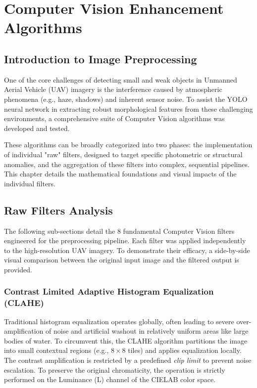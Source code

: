 
\chapter{Computer Vision Enhancement Algorithms}
\label{ch:filters}

\section{Introduction to Image Preprocessing}
One of the core challenges of detecting small and weak objects in Unmanned Aerial Vehicle (UAV) imagery is the interference caused by atmospheric phenomena (e.g., haze, shadows) and inherent sensor noise. To assist the YOLO neural network in extracting robust morphological features from these challenging environments, a comprehensive suite of Computer Vision algorithms was developed and tested.

These algorithms can be broadly categorized into two phases: the implementation of individual "raw" filters, designed to target specific photometric or structural anomalies, and the aggregation of these filters into complex, sequential pipelines. This chapter details the mathematical foundations and visual impacts of the individual filters.

\section{Raw Filters Analysis}
The following sub-sections detail the 8 fundamental Computer Vision filters engineered for the preprocessing pipeline. Each filter was applied independently to the high-resolution UAV imagery. To demonstrate their efficacy, a side-by-side visual comparison between the original input image and the filtered output is provided.

\subsection{Contrast Limited Adaptive Histogram Equalization (CLAHE)}
Traditional histogram equalization operates globally, often leading to severe over-amplification of noise and artificial washout in relatively uniform areas like large bodies of water. To circumvent this, the CLAHE algorithm partitions the image into small contextual regions (e.g., $8 \times 8$ tiles) and applies equalization locally. The contrast amplification is restricted by a predefined \textit{clip limit} to prevent noise escalation. To preserve the original chromaticity, the operation is strictly performed on the Luminance (L) channel of the CIELAB color space.

